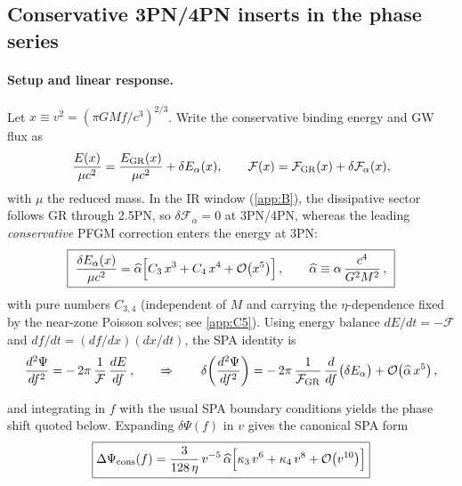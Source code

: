 \documentclass{iopjournal}
\begin{document}
\subsection{Conservative 3PN/4PN inserts in the phase series}\label{app:E3}
\paragraph{Setup and linear response.}
Let $x\equiv v^{2}=(\pi GM f/c^{3})^{2/3}$. Write the conservative binding energy and GW flux as
\begin{equation}
\frac{E(x)}{\mu c^{2}}=\frac{E_{\rm GR}(x)}{\mu c^{2}}+\delta E_\alpha(x),\qquad
\mathcal F(x)=\mathcal F_{\rm GR}(x)+\delta\mathcal F_\alpha(x),
\label{eq:E3_EF_defs}
\end{equation}
with $\mu$ the reduced mass. In the IR window (\cref{app:B}), the dissipative sector follows GR through 2.5PN, so $\delta\mathcal F_\alpha=0$ at 3PN/4PN, whereas the leading \emph{conservative} PFGM correction enters the energy at 3PN:
\begin{equation}
\boxed{\ \frac{\delta E_\alpha(x)}{\mu c^{2}}
=\widehat\alpha\Big[C_{3}\,x^{3}+C_{4}\,x^{4}+\order{x^{5}}\Big]\,,\qquad
\widehat\alpha\equiv \alpha\,\frac{c^{4}}{G^{2}M^{2}}\,,\ }
\label{eq:E3_deltaE}
\end{equation}
with pure numbers $C_{3,4}$ (independent of $M$ and carrying the $\eta$-dependence fixed by the near-zone Poisson solves; see \cref{app:C5}). Using energy balance $dE/dt=-\mathcal F$ and $df/dt=(df/dx)(dx/dt)$, the SPA identity is
\begin{equation}
\frac{d^{2}\Psi}{df^{2}}
= -\,2\pi\,\frac{1}{\mathcal{F}}\,\frac{dE}{df}\,,
\qquad\Rightarrow\qquad
\delta\!\left(\frac{d^{2}\Psi}{df^{2}}\right)
= -\,2\pi\,\frac{1}{\mathcal{F}_{\rm GR}}\,\frac{d}{df}\bigl(\delta E_{\alpha}\bigr)
+ \order{\widehat{\alpha}\,x^{5}}\,,
\label{eq:E3_variation}
\end{equation}

and integrating in $f$ with the usual SPA boundary conditions yields the phase shift quoted below. Expanding $\delta\Psi(f)$ in $v$ gives the canonical SPA form
\begin{equation}
\boxed{\Delta\Psi_{\mathrm{cons}}(f)
= \frac{3}{128\,\eta}\,v^{-5}\,\widehat{\alpha}\Bigl[\kappa_{3}\,v^{6}
+ \kappa_{4}\,v^{8} + \order{v^{10}}\Bigr]}
\label{eq:E3_cons_series}
\end{equation}
\end{document}
